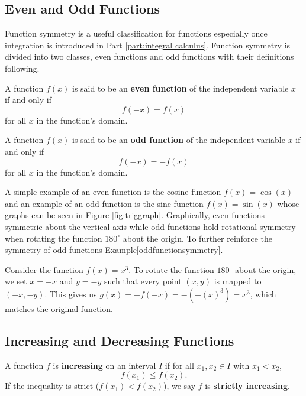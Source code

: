 \subsection{Even and Odd Functions}\label{sect:even and odd functions}

Function symmetry is a useful classification for functions especially once integration is introduced in Part \ref{part:integral calculus}. Function symmetry is divided into two classes, even functions and odd functions with their definitions following.

\begin{definition}
    A function $f(x)$ is said to be an \textbf{even function} of the independent variable $x$ if and only if
    $$
    f(-x) = f(x)
    $$
    for all $x$ in the function's domain.
\end{definition}

\begin{definition}
    A function $f(x)$ is said to be an \textbf{odd function} of the independent variable $x$ if and only if
    $$
    f(-x) = -f(x)
    $$
    for all $x$ in the function's domain.
\end{definition}

A simple example of an even function is the cosine function $f(x) = \cos(x)$ and an example of an odd function is the sine function $f(x) = \sin(x)$ whose graphs can be seen in Figure \ref{fig:triggraph}. Graphically, even functions symmetric about the vertical axis while odd functions hold rotational symmetry when rotating the function $180^\circ$ about the origin. To further reinforce the symmetry of odd functions Example\ref{oddfunctionsymmetry}.

\begin{example}\label{oddfunctionsymmetry}
    Consider the function $f(x) = x^3$. To rotate the function $180^\circ$ about the origin, we set $x = -x$ and $y = -y$ such that every point $(x,y)$ is mapped to $(-x,-y)$. This gives us $g(x) = -f(-x) = -(-(x)^3) = x^3$, which matches the original function. 
\end{example}

\subsection{Increasing and Decreasing Functions}\label{sect:increasing and decreasing functions}



\begin{definition}
    A function $f$ is \textbf{increasing} on an interval $I$ if for all $x_1, x_2 \in I$ with $x_1 < x_2$,
    $$
    f(x_1) \leq f(x_2).
    $$
    If the inequality is strict ($f(x_1) < f(x_2)$), we say $f$ is \textbf{strictly increasing}.
\end{definition}

